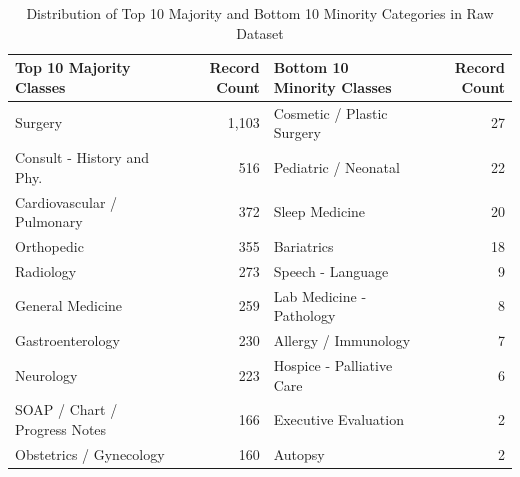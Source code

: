 \begin{table}[H]
\centering
\small
\setlength{\tabcolsep}{5pt}
\begin{tabularx}{\linewidth}{|>{\raggedright\arraybackslash}X|r|>{\raggedright\arraybackslash}X|r|}
\hline
\textbf{Top 10 Majority Classes} & \textbf{Record Count} & \textbf{Bottom 10 Minority Classes} & \textbf{Record Count} \\
\hline
Surgery & 1,103 & Cosmetic / Plastic Surgery & 27 \\
\hline
Consult - History and Phy. & 516 & Pediatric / Neonatal & 22 \\
\hline
Cardiovascular / Pulmonary & 372 & Sleep Medicine & 20 \\
\hline
Orthopedic & 355 & Bariatrics & 18 \\
\hline
Radiology & 273 & Speech - Language & 9 \\
\hline
General Medicine & 259 & Lab Medicine - Pathology & 8 \\
\hline
Gastroenterology & 230 & Allergy / Immunology & 7 \\
\hline
Neurology & 223 & Hospice - Palliative Care & 6 \\
\hline
SOAP / Chart / Progress Notes & 166 & Executive Evaluation & 2 \\
\hline
Obstetrics / Gynecology & 160 & Autopsy & 2 \\
\hline
\end{tabularx}
\caption{Distribution of Top 10 Majority and Bottom 10 Minority Categories in Raw Dataset}
\label{tab:top_bottom_specialties}
\end{table}

